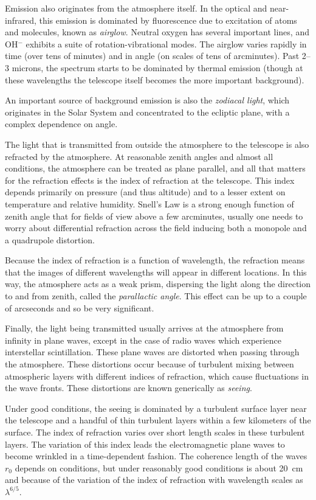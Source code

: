 Emission also originates from the atmosphere itself. 
In the optical and near-infrared, this emission is
dominated by fluorescence due to excitation of atoms and molecules,
known as {\it airglow}. Neutral oxygen has several important lines,
and OH$^{-}$ exhibits a suite of rotation-vibrational modes. The
airglow varies rapidly in time (over tens of minutes) and in angle (on
scales of tens of arcminutes). Past 2--3 microns, the spectrum starts
to be dominated by thermal emission (though at these wavelengths the
telescope itself becomes the more important background).

An important source of background emission is also the {\it zodiacal
light}, which originates in the Solar System and concentrated to the
ecliptic plane, with a complex dependence on angle.

The light that is transmitted from outside the atmosphere to the
telescope is also refracted by the atmosphere. At reasonable zenith
angles and almost all conditions, the atmosphere can be treated as
plane parallel, and all that matters for the refraction effects is the
index of refraction at the telescope. This index depends primarily on
pressure (and thus altitude) and to a lesser extent on temperature and
relative humidity. Snell's Law is a strong enough function of zenith
angle that for fields of view above a few arcminutes, usually one
needs to worry about differential refraction across the field inducing
both a monopole and a quadrupole distortion.

Because the index of refraction is a function of wavelength, the
refraction means that the images of different wavelengths will appear
in different locations. In this way, the atmosphere acts as a weak
prism, dispersing the light along the direction to and from zenith,
called the {\it parallactic angle}. This effect can be up to a couple
of arcseconds and so be very significant.

Finally, the light being transmitted usually arrives at the atmosphere
from infinity in plane waves, except in the case of radio waves which
experience interstellar scintillation. These plane waves are distorted
when passing through the atmosphere. These distortions occur because
of turbulent mixing between atmospheric layers with different indices
of refraction, which cause fluctuations in the wave fronts. These
distortions are known generically as {\it seeing}.

Under good conditions, the seeing is dominated by a turbulent surface
layer near the telescope and a handful of thin turbulent layers within
a few kilometers of the surface. The index of refraction varies over
short length scales in these turbulent layers. The variation of this
index leads the electromagnetic plane waves to become wrinkled in a
time-dependent fashion. The coherence length of the waves $r_0$
depends on conditions, but under reasonably good conditions is about
20~cm and because of the variation of the index of refraction with
wavelength scales as $\lambda^{6/5}$.


